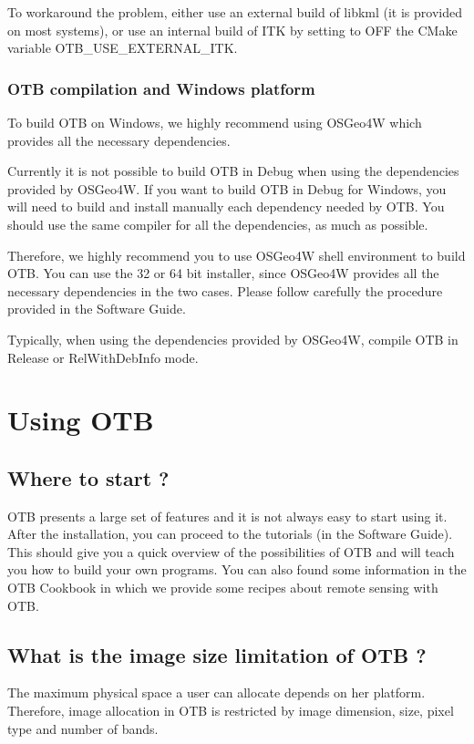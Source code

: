 To workaround the problem, either use an external build of libkml (it is provided on most systems), or use an internal build of ITK by setting to OFF the CMake variable OTB\_USE\_EXTERNAL\_ITK.

\subsubsection{OTB compilation and Windows platform}

To build OTB on Windows, we highly recommend using OSGeo4W which provides all the necessary dependencies.

Currently it is not possible to build OTB in Debug when using the dependencies provided by OSGeo4W.
If you want to build OTB in Debug for Windows, you will need to build and install manually each dependency needed by OTB.
You should use the same compiler for all the dependencies, as much as possible.

Therefore, we highly recommend you to use OSGeo4W shell environment to build OTB.
You can use the 32 or 64 bit installer, since OSGeo4W provides all the necessary dependencies in the two cases.
Please follow carefully the procedure provided in the Software Guide.

Typically, when using the dependencies provided by OSGeo4W, compile OTB in Release or RelWithDebInfo mode.

\section{Using OTB}

\subsection{Where to start ?}

OTB presents a large set of features and it is not always easy to start using it.
After the installation, you can proceed to the tutorials (in the Software Guide).
This should give you a quick overview of the possibilities of OTB and will teach
you how to build your own programs. You can also found some information in the OTB Cookbook in which we provide some recipes about remote sensing with OTB.


\subsection{What is the image size limitation of OTB ?}

The maximum physical space a user can allocate depends on her platform. Therefore, image allocation in OTB is restricted by image dimension, size, pixel type and number of bands.

